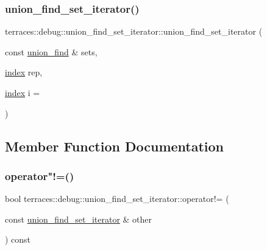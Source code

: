 \subsubsection{\texorpdfstring{union\+\_\+find\+\_\+set\+\_\+iterator()}{union\_find\_set\_iterator()}}
{\footnotesize\ttfamily terraces\+::debug\+::union\+\_\+find\+\_\+set\+\_\+iterator\+::union\+\_\+find\+\_\+set\+\_\+iterator (\begin{DoxyParamCaption}\item[{const \hyperlink{classterraces_1_1union__find}{union\+\_\+find} \&}]{sets,  }\item[{\hyperlink{namespaceterraces_adbc33ccb543d1634e96d0eb02e472c77}{index}}]{rep,  }\item[{\hyperlink{namespaceterraces_adbc33ccb543d1634e96d0eb02e472c77}{index}}]{i = {} }\end{DoxyParamCaption})\hspace{0.3cm}{\ttfamily [inline]}}



\subsection{Member Function Documentation}
\mbox{\label{classterraces_1_1debug_1_1union__find__set__iterator_a586be5d74ee3afe573cb591879e49010}} 
\subsubsection{\texorpdfstring{operator"!=()}{operator!=()}}
{\footnotesize\ttfamily bool terraces\+::debug\+::union\+\_\+find\+\_\+set\+\_\+iterator\+::operator!= (\begin{DoxyParamCaption}\item[{const \hyperlink{classterraces_1_1debug_1_1union__find__set__iterator}{union\+\_\+find\+\_\+set\+\_\+iterator} \&}]{other }\end{DoxyParamCaption}) const\hspace{0.3cm}{\ttfamily [inline]}}

\mbox{\label{classterraces_1_1debug_1_1union__find__set__iterator_a322afd0866fa7b3e670950cd4d85aa69}} 
